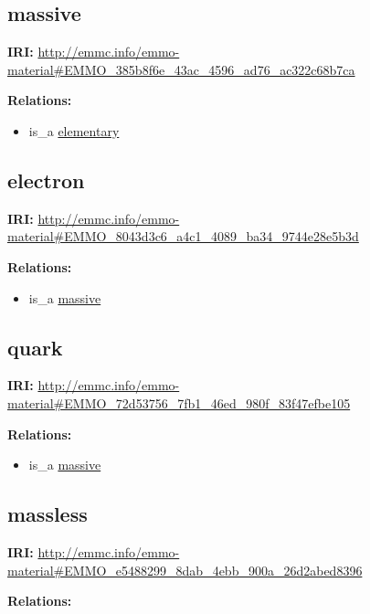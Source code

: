 \documentclass[a4paper,]{report}
\providecommand{\tightlist}{%
  \setlength{\itemsep}{0pt}\setlength{\parskip}{0pt}}
\begin{document}
\hypertarget{massive-1}{%
\subsection{massive}\label{massive-1}}

\textbf{IRI:}
\url{http://emmc.info/emmo-material\#EMMO_385b8f6e_43ac_4596_ad76_ac322c68b7ca}

\textbf{Relations:}

\begin{itemize}
\tightlist
\item
  is\_a \protect\hyperlink{elementary}{elementary}
\end{itemize}

\hypertarget{electron-1}{%
\subsection{electron}\label{electron-1}}

\textbf{IRI:}
\url{http://emmc.info/emmo-material\#EMMO_8043d3c6_a4c1_4089_ba34_9744e28e5b3d}

\textbf{Relations:}

\begin{itemize}
\tightlist
\item
  is\_a \protect\hyperlink{massive}{massive}
\end{itemize}

\hypertarget{quark-1}{%
\subsection{quark}\label{quark-1}}

\textbf{IRI:}
\url{http://emmc.info/emmo-material\#EMMO_72d53756_7fb1_46ed_980f_83f47efbe105}

\textbf{Relations:}

\begin{itemize}
\tightlist
\item
  is\_a \protect\hyperlink{massive}{massive}
\end{itemize}

\hypertarget{massless-1}{%
\subsection{massless}\label{massless-1}}

\textbf{IRI:}
\url{http://emmc.info/emmo-material\#EMMO_e5488299_8dab_4ebb_900a_26d2abed8396}

\textbf{Relations:}
\end{document}
